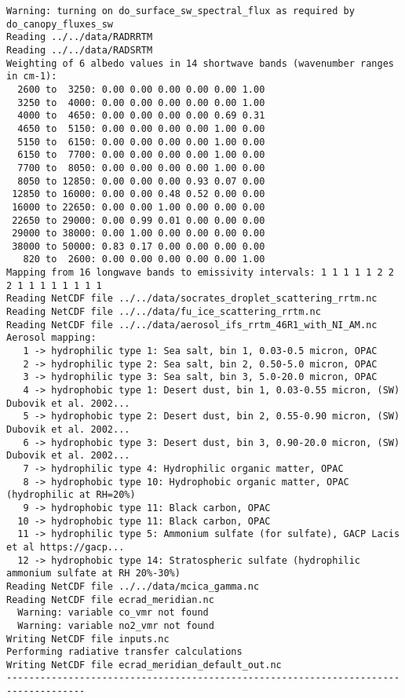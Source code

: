 \documentclass[a4,oneside]{article}
\begin{document}
\begin{verbatim}
Warning: turning on do_surface_sw_spectral_flux as required by do_canopy_fluxes_sw
Reading ../../data/RADRRTM
Reading ../../data/RADSRTM
Weighting of 6 albedo values in 14 shortwave bands (wavenumber ranges in cm-1):
  2600 to  3250: 0.00 0.00 0.00 0.00 0.00 1.00
  3250 to  4000: 0.00 0.00 0.00 0.00 0.00 1.00
  4000 to  4650: 0.00 0.00 0.00 0.00 0.69 0.31
  4650 to  5150: 0.00 0.00 0.00 0.00 1.00 0.00
  5150 to  6150: 0.00 0.00 0.00 0.00 1.00 0.00
  6150 to  7700: 0.00 0.00 0.00 0.00 1.00 0.00
  7700 to  8050: 0.00 0.00 0.00 0.00 1.00 0.00
  8050 to 12850: 0.00 0.00 0.00 0.93 0.07 0.00
 12850 to 16000: 0.00 0.00 0.48 0.52 0.00 0.00
 16000 to 22650: 0.00 0.00 1.00 0.00 0.00 0.00
 22650 to 29000: 0.00 0.99 0.01 0.00 0.00 0.00
 29000 to 38000: 0.00 1.00 0.00 0.00 0.00 0.00
 38000 to 50000: 0.83 0.17 0.00 0.00 0.00 0.00
   820 to  2600: 0.00 0.00 0.00 0.00 0.00 1.00
Mapping from 16 longwave bands to emissivity intervals: 1 1 1 1 1 2 2 2 1 1 1 1 1 1 1 1
Reading NetCDF file ../../data/socrates_droplet_scattering_rrtm.nc
Reading NetCDF file ../../data/fu_ice_scattering_rrtm.nc
Reading NetCDF file ../../data/aerosol_ifs_rrtm_46R1_with_NI_AM.nc
Aerosol mapping:
   1 -> hydrophilic type 1: Sea salt, bin 1, 0.03-0.5 micron, OPAC
   2 -> hydrophilic type 2: Sea salt, bin 2, 0.50-5.0 micron, OPAC
   3 -> hydrophilic type 3: Sea salt, bin 3, 5.0-20.0 micron, OPAC
   4 -> hydrophobic type 1: Desert dust, bin 1, 0.03-0.55 micron, (SW) Dubovik et al. 2002...
   5 -> hydrophobic type 2: Desert dust, bin 2, 0.55-0.90 micron, (SW) Dubovik et al. 2002...
   6 -> hydrophobic type 3: Desert dust, bin 3, 0.90-20.0 micron, (SW) Dubovik et al. 2002...
   7 -> hydrophilic type 4: Hydrophilic organic matter, OPAC
   8 -> hydrophobic type 10: Hydrophobic organic matter, OPAC (hydrophilic at RH=20%)
   9 -> hydrophobic type 11: Black carbon, OPAC
  10 -> hydrophobic type 11: Black carbon, OPAC
  11 -> hydrophilic type 5: Ammonium sulfate (for sulfate), GACP Lacis et al https://gacp...
  12 -> hydrophobic type 14: Stratospheric sulfate (hydrophilic ammonium sulfate at RH 20%-30%)
Reading NetCDF file ../../data/mcica_gamma.nc
Reading NetCDF file ecrad_meridian.nc
  Warning: variable co_vmr not found
  Warning: variable no2_vmr not found
Writing NetCDF file inputs.nc
Performing radiative transfer calculations
Writing NetCDF file ecrad_meridian_default_out.nc
------------------------------------------------------------------------------------
\end{verbatim}
\normalsize

\end{document}
